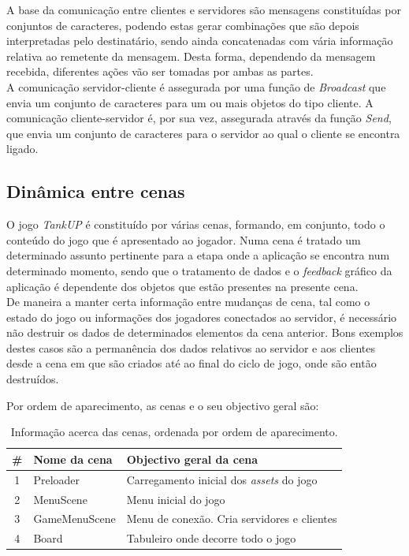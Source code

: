 A base da comunicação entre clientes e servidores são mensagens constituídas por conjuntos de caracteres, podendo estas gerar combinações que são depois interpretadas pelo destinatário, sendo ainda concatenadas com vária informação relativa ao remetente da mensagem. Desta forma, dependendo da mensagem recebida, diferentes ações vão ser tomadas por ambas as partes. \\ 

A comunicação servidor-cliente é assegurada por uma função de \emph{Broadcast} que envia um conjunto de caracteres para um ou mais objetos do tipo cliente. A comunicação cliente-servidor é, por sua vez, assegurada através da função \emph{Send}, que envia um conjunto de caracteres para o servidor ao qual o cliente se encontra ligado. 



\subsection{Dinâmica entre cenas}
\label{chap4:subsec:dinamica}
O jogo \emph{TankUP} é constituído por várias cenas, formando, em conjunto, todo o conteúdo do jogo que é apresentado ao jogador. Numa cena é tratado um determinado assunto pertinente para a etapa onde a aplicação se encontra num determinado momento, sendo que o tratamento de dados e o \textit{feedback} gráfico da aplicação é dependente dos objetos que estão presentes na presente cena. \\ 
De maneira a manter certa informação entre mudanças de cena, tal como o estado do jogo ou informações dos jogadores conectados ao servidor, é necessário não destruir os dados de determinados elementos da cena anterior. Bons exemplos destes casos são a permanência dos dados relativos ao servidor e aos clientes desde a cena em que são criados até ao final do ciclo de jogo, onde são então destruídos.

Por ordem de aparecimento, as cenas e o seu objectivo geral são:

\begin{table}[!h]
\centering
\caption{Informação acerca das cenas, ordenada por ordem de aparecimento.}

\label{tab:tabela_informacao_cenas}
\begin{tabular}{|c||l|l|}
\hline
\textbf{\#} & \textbf{Nome da cena} & \textbf{Objectivo geral da cena} \\
\hline
\hline
1 & Preloader & Carregamento inicial dos \textit{assets} do jogo \\
\hline	
2 & MenuScene & Menu inicial do jogo \\
\hline
3 & GameMenuScene  & Menu de conexão. Cria servidores e clientes\\
\hline
4 & Board & Tabuleiro onde decorre todo o jogo \\
\hline
\end{tabular}
\end{table}

